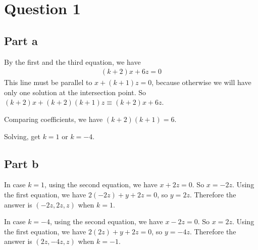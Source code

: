 \section*{Question 1}
\subsection*{Part a}
By the first and the third equation, we have
\begin{eqnarray*}
  (k + 2) x + 6z = 0
\end{eqnarray*}
This line must be parallel to $ x + (k + 1)z = 0 $, because otherwise we will have only one solution at the intersection point. So $ (k+2)x + (k+2)(k+1)z \equiv (k+2)x + 6z $. 

Comparing coefficients, we have $ (k+2)(k+1) = 6 $. 

Solving, get $ k = 1 $ or $ k = -4 $.

\subsection*{Part b}
In case $ k = 1 $, using the second equation, we have $ x + 2z = 0 $. So $ x = -2z $. Using the first equation, we have $ 2(-2z) + y + 2z = 0 $, so $ y = 2z $. Therefore the answer is $ (-2z, 2z, z) $ when $ k = 1$.

In case $ k = -4 $, using the second equation, we have $ x - 2z = 0 $. So $ x = 2z $. Using the first equation, we have $ 2(2z) + y + 2z = 0 $, so $ y = -4z $. Therefore the answer is $ (2z, -4z, z) $ when $ k = -1$.